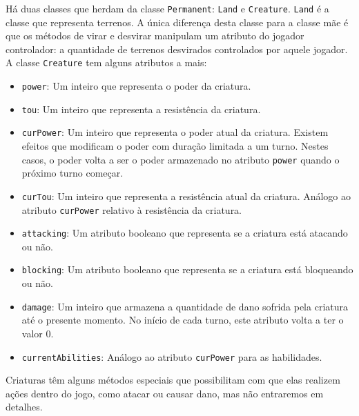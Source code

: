 \documentclass[dvipsnames]{book}
\begin{document}
Há duas classes que herdam da classe \texttt{Permanent}: \texttt{Land} e \texttt{Creature}.
\texttt{Land} é a classe que representa terrenos. A única diferença desta classe para a classe
mãe é que os métodos de virar e desvirar manipulam um atributo do jogador controlador: a quantidade
de terrenos desvirados controlados por aquele jogador. A classe \texttt{Creature} tem alguns
atributos a mais:
\begin{itemize}
  \item\texttt{power}: Um inteiro que representa o poder da criatura.
  \item\texttt{tou}: Um inteiro que representa a resistência da criatura.
  \item\texttt{curPower}: Um inteiro que representa o poder atual da criatura. Existem efeitos
  que modificam o poder com duração limitada a um turno. Nestes casos, o poder volta a ser o
  poder armazenado no atributo \texttt{power} quando o próximo turno começar.
  \item\texttt{curTou}: Um inteiro que representa a resistência atual da criatura. Análogo ao
  atributo \texttt{curPower} relativo à resistência da criatura.
  \item\texttt{attacking}: Um atributo booleano que representa se a criatura está atacando
  ou não.
  \item\texttt{blocking}: Um atributo booleano que representa se a criatura está bloqueando
  ou não.
  \item\texttt{damage}: Um inteiro que armazena a quantidade de dano sofrida pela criatura até
  o presente momento. No início de cada turno, este atributo volta a ter o valor $0$.
  \item\texttt{currentAbilities}: Análogo ao atributo \texttt{curPower} para as habilidades.
\end{itemize}
Criaturas têm alguns métodos especiais que possibilitam com que elas realizem ações dentro
do jogo, como atacar ou causar dano, mas não entraremos em detalhes.
\end{document}
